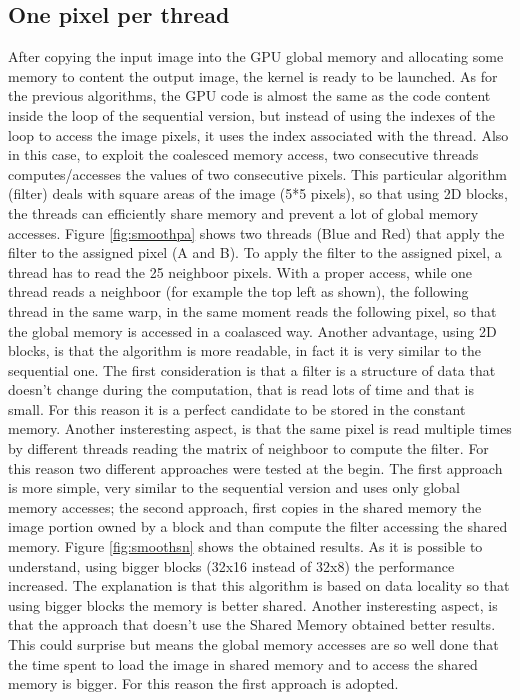 \documentclass[a4paper]{article}
\begin{document}
\subsection{One pixel per thread}
\label{sec:opts}
After copying the input image into the GPU global memory and allocating some memory to content the output image, the kernel is ready to be launched. As for the previous algorithms, the GPU code is almost the same as the code content inside the loop of the sequential version, but instead of using the indexes of the loop to access the image pixels, it uses the index associated with the thread. Also in this case, to exploit the coalesced memory access, two consecutive threads computes/accesses the values of two consecutive pixels.
This particular algorithm (filter) deals with square areas of the image (5*5 pixels), so that using 2D blocks, the threads can efficiently share memory and prevent a lot of global memory accesses. Figure \ref{fig:smoothpa} shows two threads (Blue and Red) that apply the filter to the assigned pixel (A and B). To apply the filter to the assigned pixel, a thread has to read the 25 neighboor pixels. With a proper access, while one thread reads a neighboor (for example the top left as shown), the following thread in the same warp, in the same moment reads the following pixel, so that the global memory is accessed in a coalasced way. Another advantage, using 2D blocks, is that the algorithm is more readable, in fact it is very similar to the sequential one. The first consideration is that a filter is a structure of data that doesn't change during the computation, that is read lots of time and that is small. For this reason it is a perfect candidate to be stored in the constant memory. Another insteresting aspect, is that the same pixel is read multiple times by different threads reading the matrix of neighboor to compute the filter. For this reason two different approaches were tested at the begin. The first approach is more simple, very similar to the sequential version and uses only global memory accesses; the second approach, first copies in the shared memory the image portion owned by a block and than compute the filter accessing the shared memory. Figure \ref{fig:smoothsn} shows the obtained results. As it is possible to understand, using bigger blocks (32x16 instead of 32x8) the performance increased. The explanation is that this algorithm is based on data locality so that using bigger blocks the memory is better shared. Another insteresting aspect, is that the approach that doesn't use the Shared Memory obtained better results. This could surprise but means the global memory accesses are so well done that the time spent to load the image in shared memory and to access the shared memory is bigger. For this reason the first approach is adopted.
\end{document}
